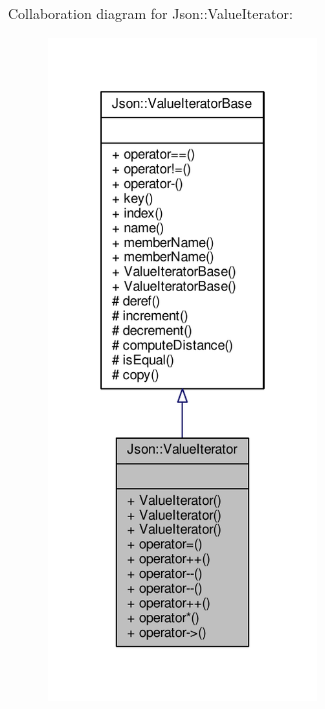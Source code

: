 Collaboration diagram for Json\+:\+:Value\+Iterator\+:
\nopagebreak
\begin{figure}[H]
\begin{center}
\leavevmode
\includegraphics[width=202pt]{d3/dd0/classJson_1_1ValueIterator__coll__graph}
\end{center}
\end{figure}
